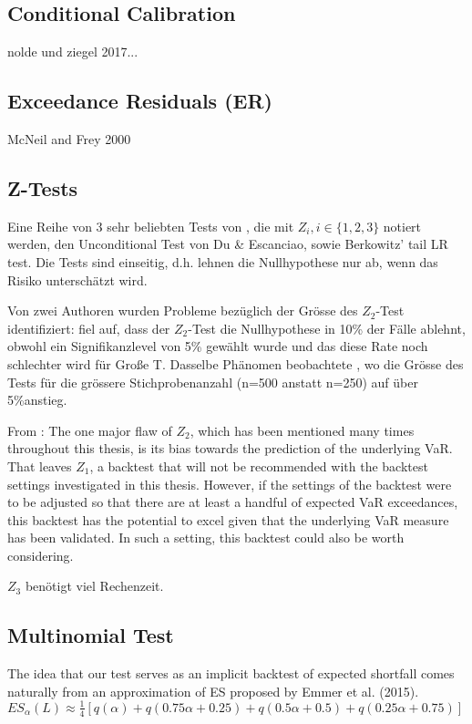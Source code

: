 \documentclass[12pt,a4paper]{article}
\begin{document}
	\subsection{Conditional Calibration}
	nolde und ziegel 2017...
	
	\subsection{Exceedance Residuals (ER)}
	McNeil and Frey 2000
	
	\subsection{Z-Tests}
	Eine Reihe von 3 sehr beliebten Tests von \cite{acerbi_minimally_2019}, die mit $Z_i, i \in \{1,2,3\}$ notiert werden, den Unconditional Test von Du \& Escanciao, sowie Berkowitz' tail LR test.
	Die Tests sind einseitig, d.h. lehnen die Nullhypothese nur ab, wenn das Risiko unterschätzt wird.
	
	Von zwei Authoren wurden Probleme bezüglich der Grösse des $Z_2$-Test identifiziert:
	\cite{spring_backtesting_2021} fiel auf, dass der $Z_2$-Test die Nullhypothese in 10\% der Fälle ablehnt, obwohl ein Signifikanzlevel von 5\% gewählt wurde und das diese Rate noch schlechter wird für Große T.
	Dasselbe Phänomen beobachtete \cite{garcia_performance_2019}, wo die Grösse des Tests für die grössere Stichprobenanzahl (n=500 anstatt n=250) auf über 5\%anstieg.
	
	From \cite{berglund_backtesting_2022}:
	The one major flaw of $Z_2$, which has been mentioned many times throughout this thesis, is its bias towards the prediction of the underlying VaR.
	That leaves $Z_1$, a backtest that will not be recommended with the backtest settings investigated in this thesis. 
	However, if the settings of the backtest were to be adjusted so that there are at least a handful of expected VaR exceedances, this backtest has the potential to excel given that the underlying VaR measure has been validated. 
	In such a setting, this backtest could also be worth considering.
	
	$Z_3$ benötigt viel Rechenzeit.
	
	\subsection{Multinomial Test}
	\cite{kratz_multinomial_2016} The idea that our test serves as an implicit backtest of expected shortfall comes naturally from an approximation of ES proposed by Emmer et al. (2015).
	$ES_\alpha(L) \approx \frac{1}{4}[q(\alpha)+q(0.75 \alpha+0.25)+q(0.5 \alpha+0.5)+q(0.25 \alpha+0.75)]$
	
\end{document}
